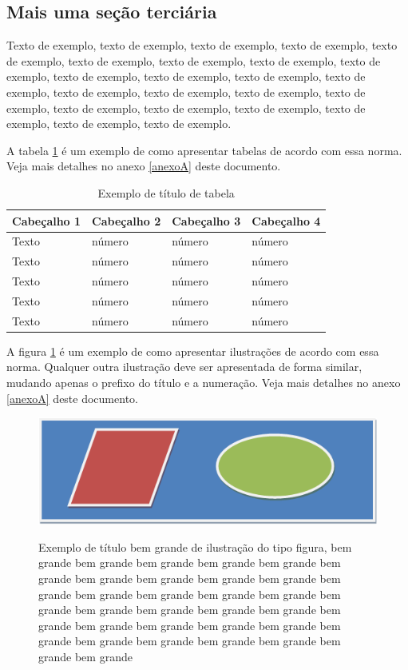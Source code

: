 \documentclass[
	12pt,				%
	oneside,			%
	a4paper,			%
	english,			%
	brazil				%
	]{abntex2ppgsi}
\begin{document}
\subsection{Mais uma seção terciária}

Texto de exemplo, texto de exemplo, texto de exemplo, texto de exemplo, texto de exemplo, texto de exemplo, texto de exemplo, texto de exemplo, texto de exemplo, texto de exemplo, texto de exemplo, texto de exemplo, texto de exemplo, texto de exemplo, texto de exemplo, texto de exemplo, texto de exemplo, texto de exemplo, texto de exemplo, texto de exemplo, texto de exemplo, texto de exemplo, texto de exemplo.

A tabela \ref{tab:ExemploDeTabela3} é um exemplo de como apresentar tabelas de acordo com essa norma. Veja mais detalhes no anexo \ref{anexoA} deste documento.

\begin{table}[htbp]
	\centering
	\caption{Exemplo de título de tabela}
		\begin{tabular}{p{0.85in} p{0.85in} p{0.85in} p{0.85in} } \hline
		
		Cabeçalho 1	& Cabeçalho 2	& Cabeçalho 3	& Cabeçalho 4 \\ \hline
		Texto	& número & número	& número \\ 
		Texto	& número & número	& número \\ 
		Texto	& número & número	& número \\ 
		Texto	& número & número	& número \\ 
		Texto	& número & número	& número \\ \hline
			
		\end{tabular}
	\label{tab:ExemploDeTabela3}
\end{table}


A figura \ref{fig:figura-exemplo4} é um exemplo de como apresentar ilustrações de acordo com essa norma. Qualquer outra ilustração deve ser apresentada de forma similar, mudando apenas o prefixo do título e a numeração. Veja mais detalhes no anexo \ref{anexoA} deste documento.

\begin{figure}[htbp]
	\centering
	\caption{Exemplo de título bem grande de ilustração do tipo figura, bem grande bem grande bem grande bem grande bem grande bem grande bem grande bem grande bem grande bem grande bem grande bem grande bem grande bem grande bem grande bem grande bem grande bem grande bem grande bem grande bem grande bem grande bem grande bem grande bem grande bem grande bem grande bem grande bem grande bem grande bem grande bem grande}
		\includegraphics{figura-exemplo.png}
	\label{fig:figura-exemplo4}
\end{figure}
\end{document}
